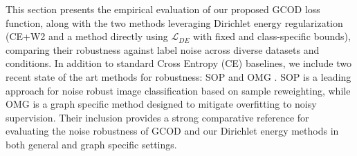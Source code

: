 This section presents the empirical evaluation of our proposed GCOD loss function, along with the two methods leveraging Dirichlet energy regularization (CE+W2 and a method directly using $\mathcal{L}_{DE}$ with fixed and class-specific bounds), comparing their robustness against label noise across diverse datasets and conditions. In addition to standard Cross Entropy (CE) baselines, we include two recent state of the art methods for robustness: SOP \citet{liu2022robusttraininglabelnoise} and OMG \citep{omg7}. SOP is a leading approach for noise robust image classification based on sample reweighting, while OMG is a graph specific method designed to mitigate overfitting to noisy supervision. Their inclusion provides a strong comparative reference for evaluating the noise robustness of GCOD and our Dirichlet energy methods in both general and graph specific settings.
